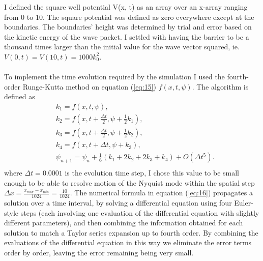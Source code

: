 \documentclass[10pt, a4paper, singlespacing, headsepline]{report}
\begin{document}
I defined the square well potential V(x, t) as an array over an x-array ranging from $0$ to $10$. The square potential was defined as zero everywhere except at the boundaries. The boundaries' height was determined by trial and error based on the kinetic energy of the wave packet. I settled with having the barrier to be a thousand times larger than the initial value for the wave vector squared, \mbox{ie. $V(0, t) = V(10, t) = 1000k_0^2$}.\\\\
To implement the time evolution required by the simulation I used the fourth-order Runge-Kutta method on equation (\ref{eq:15}) $f(x, t, \psi)$. The algorithm is defined as
\begin{equation} \label{eq:16}
\begin{split}
&k_1 = f(x, t, \psi),\\
&k_2 = f(x, t + \frac{\Delta t}{2}, \psi + \frac{1}{2}k_1),\\
&k_3 = f(x, t + \frac{\Delta t}{2}, \psi + \frac{1}{2}k_2),\\
&k_4 = f(x, t + \Delta t, \psi + k_3),\\
&\psi_{n + 1} = \psi_{n} + \frac{1}{6}(k_1 + 2k_2 + 2k_3 + k_4) + O(\Delta t^5).\\
\end{split}
\end{equation}
where $\Delta t = 0.0001$ is the evolution time step, I chose this value to be small enough to be able to resolve motion of the Nyquist mode within the spatial step 
$\Delta x = \frac{x_{\mathrm{max}} - x_{\mathrm{min}}}{1024} = \frac{10}{1024}$.
The numerical formula in equation (\ref{eq:16}) propagates a solution over a time interval, by solving a differential equation using four Euler-style steps (each involving one evaluation of the differential equation with slightly different parameters), and then combining the information obtained for each solution to match a Taylor series expansion up to fourth order. By combining the evaluations of the differential equation in this way we eliminate the error terms order by order, leaving the error remaining being very small\cite{N_R}.
\end{document}
